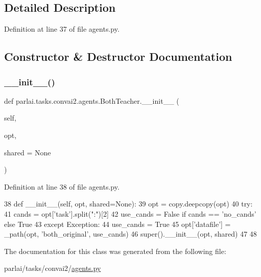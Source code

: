 \subsection{Detailed Description}


Definition at line 37 of file agents.\+py.



\subsection{Constructor \& Destructor Documentation}
\mbox{\label{classparlai_1_1tasks_1_1convai2_1_1agents_1_1BothTeacher_acae96b99b1aa547acb06ee854936e50b}} 
\subsubsection{\texorpdfstring{\+\_\+\+\_\+init\+\_\+\+\_\+()}{\_\_init\_\_()}}
{\footnotesize\ttfamily def parlai.\+tasks.\+convai2.\+agents.\+Both\+Teacher.\+\_\+\+\_\+init\+\_\+\+\_\+ (\begin{DoxyParamCaption}\item[{}]{self,  }\item[{}]{opt,  }\item[{}]{shared = {\ttfamily None} }\end{DoxyParamCaption})}



Definition at line 38 of file agents.\+py.


\begin{DoxyCode}
38     \textcolor{keyword}{def }\_\_init\_\_(self, opt, shared=None):
39         opt = copy.deepcopy(opt)
40         \textcolor{keywordflow}{try}:
41             cands = opt[\textcolor{stringliteral}{'task'}].split(\textcolor{stringliteral}{":"})[2]
42             use\_cands = \textcolor{keyword}{False} \textcolor{keywordflow}{if} cands == \textcolor{stringliteral}{'no\_cands'} \textcolor{keywordflow}{else} \textcolor{keyword}{True}
43         \textcolor{keywordflow}{except} Exception:
44             use\_cands = \textcolor{keyword}{True}
45         opt[\textcolor{stringliteral}{'datafile'}] = \_path(opt, \textcolor{stringliteral}{'both\_original'}, use\_cands)
46         super().\_\_init\_\_(opt, shared)
47 
48 
\end{DoxyCode}


The documentation for this class was generated from the following file\+:\begin{DoxyCompactItemize}
\item 
parlai/tasks/convai2/\hyperlink{parlai_2tasks_2convai2_2agents_8py}{agents.\+py}\end{DoxyCompactItemize}
